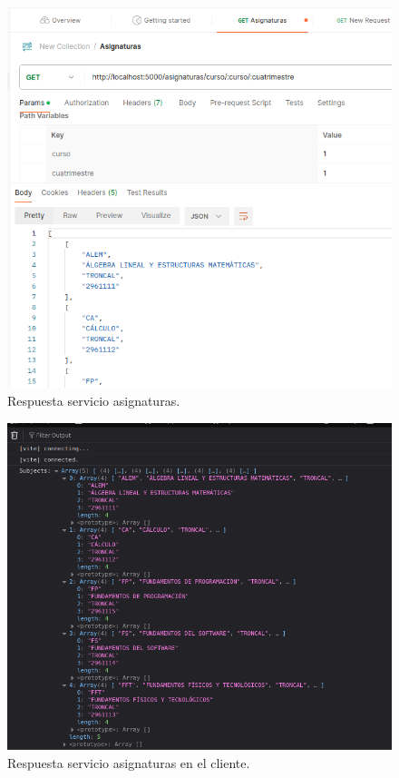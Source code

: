 \begin{figure}[H]
    \centering
    \includegraphics[width=1\textwidth]{./imagenes/get_asignaturas_respuesta.png}
    \caption{Respuesta servicio asignaturas.}
    \label{fig:get_asignaturas_respuesta}
\end{figure}

\begin{figure}[H]
    \centering
    \includegraphics[width=1\textwidth]{./imagenes/get_asignaturas_respuesta_cliente.png}
    \caption{Respuesta servicio asignaturas en el cliente.}
    \label{fig:get_asignaturas_respuesta_cliente}
\end{figure}


